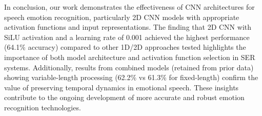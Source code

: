 In conclusion, our work demonstrates the effectiveness of CNN architectures for speech emotion recognition, particularly 2D CNN models with appropriate activation functions and input representations. The finding that 2D CNN with SiLU activation and a learning rate of 0.001 achieved the highest performance (64.1\% accuracy) compared to other 1D/2D approaches tested highlights the importance of both model architecture and activation function selection in SER systems. Additionally, results from combined models (retained from prior data) showing variable-length processing (62.2\% vs 61.3\% for fixed-length) confirm the value of preserving temporal dynamics in emotional speech. These insights contribute to the ongoing development of more accurate and robust emotion recognition technologies.